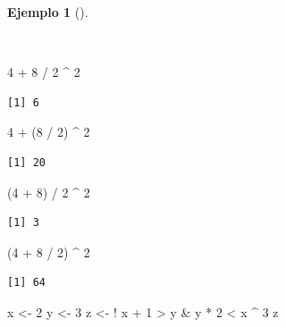 \documentclass[
  spanish,
  a4paper,
]{scrreport}
\newenvironment{Shaded}{\begin{snugshade}}{\end{snugshade}}
\newcommand{\DecValTok}[1]{\textcolor[rgb]{0.68,0.00,0.00}{#1}}
\newcommand{\NormalTok}[1]{\textcolor[rgb]{0.00,0.23,0.31}{#1}}
\newcommand{\OtherTok}[1]{\textcolor[rgb]{0.00,0.23,0.31}{#1}}
\newcommand{\SpecialCharTok}[1]{\textcolor[rgb]{0.37,0.37,0.37}{#1}}
\theoremstyle{definition}
\theoremstyle{definition}
\newtheorem{example}{Ejemplo}[chapter]
\theoremstyle{remark}
\begin{document}
\begin{example}[]\protect\hypertarget{exm-prioridad-evaluacion}{}\label{exm-prioridad-evaluacion}

~

\begin{Shaded}
\begin{Highlighting}[]
\DecValTok{4} \SpecialCharTok{+} \DecValTok{8} \SpecialCharTok{/} \DecValTok{2} \SpecialCharTok{\^{}} \DecValTok{2}
\end{Highlighting}
\end{Shaded}

\begin{verbatim}
[1] 6
\end{verbatim}

\begin{Shaded}
\begin{Highlighting}[]
\DecValTok{4} \SpecialCharTok{+}\NormalTok{ (}\DecValTok{8} \SpecialCharTok{/} \DecValTok{2}\NormalTok{) }\SpecialCharTok{\^{}} \DecValTok{2}
\end{Highlighting}
\end{Shaded}

\begin{verbatim}
[1] 20
\end{verbatim}

\begin{Shaded}
\begin{Highlighting}[]
\NormalTok{(}\DecValTok{4} \SpecialCharTok{+} \DecValTok{8}\NormalTok{) }\SpecialCharTok{/} \DecValTok{2} \SpecialCharTok{\^{}} \DecValTok{2}
\end{Highlighting}
\end{Shaded}

\begin{verbatim}
[1] 3
\end{verbatim}

\begin{Shaded}
\begin{Highlighting}[]
\NormalTok{(}\DecValTok{4} \SpecialCharTok{+} \DecValTok{8} \SpecialCharTok{/} \DecValTok{2}\NormalTok{) }\SpecialCharTok{\^{}} \DecValTok{2}
\end{Highlighting}
\end{Shaded}

\begin{verbatim}
[1] 64
\end{verbatim}

\begin{Shaded}
\begin{Highlighting}[]
\NormalTok{x }\OtherTok{\textless{}{-}} \DecValTok{2} 
\NormalTok{y }\OtherTok{\textless{}{-}} \DecValTok{3}
\NormalTok{z }\OtherTok{\textless{}{-}} \SpecialCharTok{!}\NormalTok{ x }\SpecialCharTok{+} \DecValTok{1} \SpecialCharTok{\textgreater{}}\NormalTok{ y }\SpecialCharTok{\&}\NormalTok{ y }\SpecialCharTok{*} \DecValTok{2}  \SpecialCharTok{\textless{}}\NormalTok{ x }\SpecialCharTok{\^{}} \DecValTok{3}
\NormalTok{z}
\end{Highlighting}
\end{Shaded}


\end{example}
\end{document}

